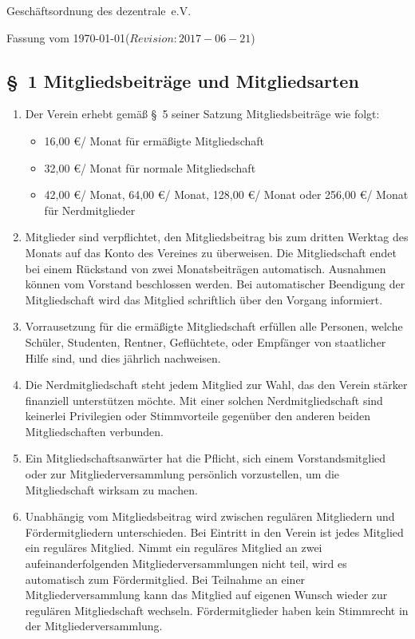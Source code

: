 \documentclass[10pt,a4paper]{article}
\newcommand{\name}{dezentrale}
\newcommand{\revision}{$Revision: 2017-06-21$}
\begin{document}
{\LARGE Gesch{\"a}ftsordnung des \name\ e.V.}

Fassung vom \today (\revision)
%
%
\subsection*{\S \ 1 Mitgliedsbeitr{\"a}ge und Mitgliedsarten}
\begin{enumerate}
\item Der Verein erhebt gem{\"a}{\ss} \S \ 5 seiner Satzung Mitgliedsbeitr{\"a}ge wie folgt:
	\begin{itemize}
    \item 16,00 \euro / Monat f{\"u}r erm{\"a}{\ss}igte Mitgliedschaft
    \item 32,00 \euro / Monat f{\"u}r normale Mitgliedschaft
	\item 42,00 \euro / Monat, 64,00 \euro / Monat, 128,00 \euro / Monat oder 256,00 \euro / Monat f{\"u}r Nerdmitglieder
	\end{itemize}
    

    \item Mitglieder sind verpflichtet, den Mitgliedsbeitrag bis zum dritten Werktag des Monats
    auf das Konto des Vereines zu {\"u}berweisen. Die Mitgliedschaft endet bei einem R{\"u}ckstand
    von zwei Monatsbeitr{\"a}gen automatisch. Ausnahmen k{\"o}nnen vom Vorstand beschlossen werden.
    Bei automatischer Beendigung der Mitgliedschaft wird das Mitglied schriftlich {\"u}ber den
    Vorgang informiert.

    \item Vorrausetzung f{\"u}r die erm{\"a}{\ss}igte Mitgliedschaft erf{\"u}llen alle Personen, welche Sch{\"u}ler, Studenten,
    Rentner, Gefl{\"u}chtete, oder Empf{\"a}nger von staatlicher Hilfe sind, und dies j{\"a}hrlich nachweisen.

\item Die Nerdmitgliedschaft steht jedem Mitglied zur Wahl, das den Verein st{\"a}rker
	finanziell unterst{\"u}tzen m{\"o}chte. Mit einer solchen
	Nerdmitgliedschaft sind keinerlei Privilegien oder Stimmvorteile gegen{\"u}ber
	den anderen beiden Mitgliedschaften verbunden.
    
    \item Ein Mitgliedschaftsanw{\"a}rter hat die Pflicht, sich einem Vorstandsmitglied oder zur 
    Mitgliederversammlung pers{\"o}nlich vorzustellen, um die Mitgliedschaft wirksam zu machen.
    \item Unabh{\"a}ngig vom Mitgliedsbeitrag wird zwischen regul{\"a}ren Mitgliedern und F{\"o}rdermitgliedern
    unterschieden. Bei Eintritt in den Verein ist jedes Mitglied ein regul{\"a}res Mitglied.
    Nimmt ein regul{\"a}res Mitglied an zwei aufeinanderfolgenden Mitgliederversammlungen nicht
    teil, wird es automatisch zum F{\"o}rdermitglied. Bei Teilnahme an einer Mitgliederversammlung
    kann das Mitglied auf eigenen Wunsch wieder zur regul{\"a}ren Mitgliedschaft wechseln.
    F{\"o}rdermitglieder haben kein Stimmrecht in der Mitgliederversammlung.


\end{enumerate}
\end{document}
